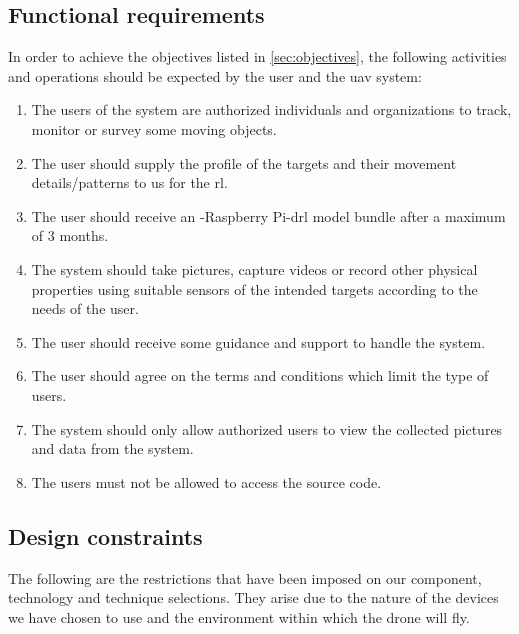 \documentclass[../main.tex]{subfiles}
\begin{document}
\subsection{Functional requirements}

In order to achieve the objectives listed
in \cref{sec:objectives}, the following activities 
and operations should be expected by the user 
and the \gls{uav} system:

\begin{enumerate}
    \item The users of the system are authorized
        individuals and organizations to track, monitor or survey
        some moving objects.
    \item The user should supply the 
        profile of the targets 
        and their movement details/patterns
        to us for the \gls{rl}.
    \item The user should receive 
        an \anafi-Raspberry Pi-\gls{drl} 
        model bundle after a maximum of 3 months.
    \item The system should take pictures, capture videos
        or record other physical properties using
        suitable sensors of the intended
        targets according to the needs
        of the user.
    \item The user should receive some 
        guidance and support 
        to handle the system.
    \item The user should agree on 
        the terms and conditions 
        which limit the type of users.
    \item The system should only allow 
        authorized users 
        to view the collected pictures and 
        data from the \anafi system.
    \item The users must not be allowed to access 
        the source code.
\end{enumerate}

\subsection{Design constraints}

The following are the restrictions that have been imposed
on our component, technology and technique selections. 
They arise due to the nature of 
the devices we have chosen to use 
and the environment within which the drone will fly.
\end{document}

